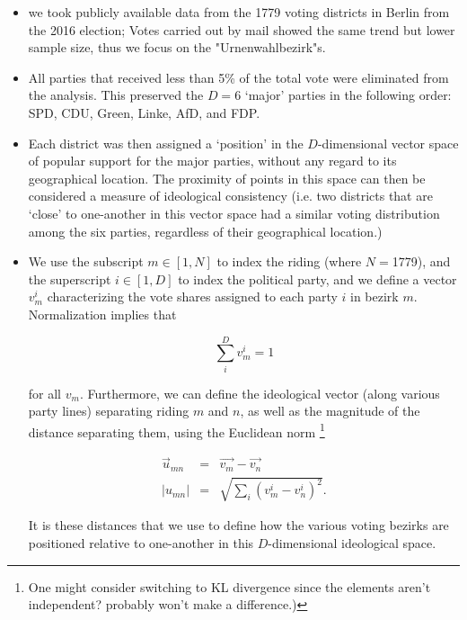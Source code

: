 \documentclass[amsmath,amssymb,nofootinbib,12pt,preprint]{revtex4}
\begin{document}
\begin{itemize}
\item  we took publicly available data from the  1779 voting districts in Berlin from the 2016 election; Votes carried out by mail showed the same trend but lower sample size, thus we focus on the "Urnenwahlbezirk"s.

\item All parties that received less than 5\% of the total vote were eliminated from the analysis. This preserved the $D=$6 `major'  parties in the following order: SPD, CDU, Green, Linke, AfD, and FDP.

\item Each district was then assigned a `position' in the $D$-dimensional vector space of popular support for the major parties, without any regard to its geographical location. The proximity of points in this space can then be considered a measure of ideological consistency (i.e. two districts that are `close' to one-another in this vector space had a similar voting distribution among the six parties, regardless of their geographical location.)

\item We use the subscript $m\in [1,N]$ to index the riding (where $N=$1779), and the superscript $i\in [1,D]$ to index the political party, and we define a vector $v^{i}_{m}$ characterizing the vote shares assigned to each party $i$ in bezirk $m$. Normalization implies that 

\begin{equation}
\sum\limits_{i}^{D}v^i_m =1
\end{equation}

for all $v_m$. Furthermore, we can define the ideological vector (along various party lines) separating riding $m$ and $n$, as well as the magnitude of the distance separating them, using the Euclidean norm \footnote{ {\color{red} One might consider switching to KL divergence since the elements aren't independent? probably won't make a difference.)} } 

\begin{align}
\vec u_{mn} &=& \vec {v_m} - \vec{v_n} \\
\left| u_{mn}\right| &=& \sqrt{  \sum\limits_{i}\left( v_m^i - v_n^i \right)^2 }.
\end{align}

It is these distances that we use to define how the various voting bezirks are positioned relative to one-another in this $D$-dimensional ideological space.

\end{itemize}
\end{document}
